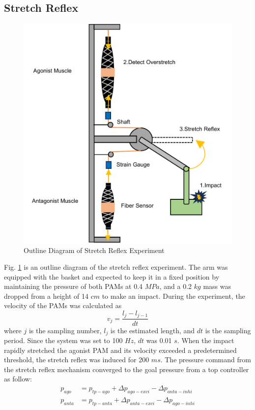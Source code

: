 \subsection{Stretch Reflex}
\begin{figure}[t]
    \centering
    \includegraphics[width=0.7\columnwidth]{fig/reflex_experiment.pdf}
    \caption{Outline Diagram of Stretch Reflex Experiment}
    \label{fig:reflex_equipment}
 \end{figure}
Fig. \ref{fig:reflex_equipment} is an outline diagram of the stretch reflex experiment.
The arm was equipped with the basket and expected to keep it in a fixed position by maintaining the pressure of both PAMs at 0.4 $\si{MPa}$, and a 0.2 $\si{kg}$ mass was dropped from a height of 14 $\si{cm}$ to make an impact. During the experiment, the velocity of the PAMs was calculated as 
\begin{equation}
    \label{eq:velocity}
    v_j = \frac{l_j -l_{j-1}}{dt}
\end{equation}
where $j$ is the sampling number, $l_j$ is the estimated length, and $dt$ is the sampling period.
Since the system was set to 100 $\si{Hz}$, $dt$ was 0.01 $\si{s}$.
When the impact rapidly stretched the agonist PAM and its velocity exceeded a predetermined threshold, the stretch reflex was induced for 200 $\si{ms}$. The pressure command from the stretch reflex mechanism converged to the goal pressure from a top controller as follow:
\begin{align}
    \label{eq:command_pressure}
    p_{ago} &= p_{tp - ago} + \Delta p_{ago - exci} - \Delta p_{anta - inhi} \\
    p_{anta} &= p_{tp - anta} + \Delta p_{anta - exci} - \Delta p_{ago - inhi}
\end{align}
